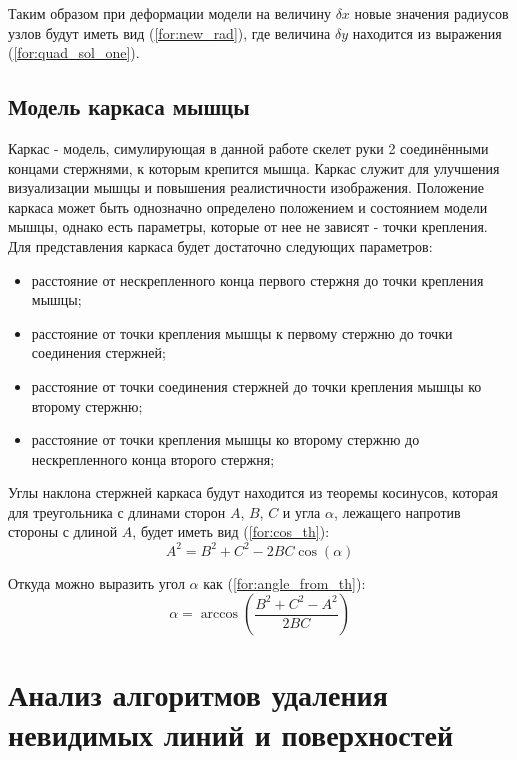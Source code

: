 Таким образом при деформации модели на величину $\delta x$ новые значения радиусов узлов будут иметь вид (\ref{for:new_rad}), где величина $\delta y$ находится из выражения (\ref{for:quad_sol_one}).

\subsection{Модель каркаса мышцы}

Каркас - модель, симулирующая в данной работе скелет руки 2 соединёнными концами стержнями, к которым крепится мышца. Каркас служит для улучшения визуализации мышцы и повышения реалистичности изображения. Положение каркаса может быть однозначно определено положением и состоянием модели мышцы, однако есть параметры, которые от нее не зависят - точки крепления. Для представления каркаса будет достаточно следующих параметров:
\begin{itemize}
    \item расстояние от нескрепленного конца первого стержня до точки крепления мышцы;
    \item расстояние от точки крепления мышцы к первому стержню до точки соединения стержней;
    \item расстояние от точки соединения стержней до точки крепления мышцы ко второму стержню;
    \item расстояние от точки крепления мышцы ко второму стержню до нескрепленного конца второго стержня;
\end{itemize}

Углы наклона стержней каркаса будут находится из теоремы косинусов, которая для треугольника с длинами сторон $A$, $B$, $C$ и угла $\alpha$, лежащего напротив стороны с длиной $A$, будет иметь вид (\ref{for:cos_th}):
\begin{equation}
    \label{for:cos_th}
    A^2 = B^2 + C^2 - 2BC \cos(\alpha)
\end{equation}

Откуда можно выразить угол $\alpha$ как (\ref{for:angle_from_th}):
\begin{equation}
    \label{for:angle_from_th}
    \alpha = \arccos{\left(\frac{B^2 + C^2 - A^2}{2BC}\right)}
\end{equation}

\section{Анализ алгоритмов удаления невидимых линий и поверхностей}

